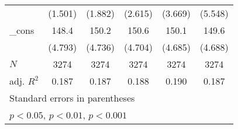 {\begin{tabular}{l*{5}{c}}
            &     (1.501)         &     (1.882)         &     (2.615)         &     (3.669)         &     (5.548)         \\
[1em]
\_cons      &       148.4\sym{***}&       150.2\sym{***}&       150.6\sym{***}&       150.1\sym{***}&       149.6\sym{***}\\
            &     (4.793)         &     (4.736)         &     (4.704)         &     (4.685)         &     (4.688)         \\
\hline
\(N\)       &        3274         &        3274         &        3274         &        3274         &        3274         \\
adj. \(R^{2}\)&       0.187         &       0.187         &       0.188         &       0.190         &       0.187         \\
\hline\hline
\multicolumn{6}{l}{\footnotesize Standard errors in parentheses}\\
\multicolumn{6}{l}{\footnotesize \sym{*} \(p<0.05\), \sym{**} \(p<0.01\), \sym{***} \(p<0.001\)}\\
\end{tabular}
}
